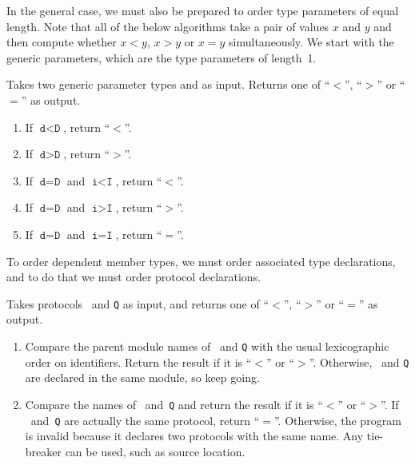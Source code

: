 \documentclass[../generics]{subfiles}
\begin{document}
In the general case, we must also be prepared to order type parameters of equal length. Note that all of the below algorithms take a pair of values $x$ and $y$ and then compute whether $x<y$, $x>y$ or $x=y$ simultaneously. We start with the generic parameters, which are the type parameters of length~1.

\begin{algorithm}\label{generic parameter order} Takes two generic parameter types  and  as input. Returns one of ``$<$'', ``$>$'' or ``$=$'' as output.
\begin{enumerate}
\item If $\texttt{d}<\texttt{D}$, return ``$<$''.
\item If $\texttt{d}>\texttt{D}$, return ``$>$''.
\item If $\texttt{d}=\texttt{D}$ and $\texttt{i}<\texttt{I}$, return ``$<$''.
\item If $\texttt{d}=\texttt{D}$ and $\texttt{i}>\texttt{I}$, return ``$>$''.
\item If $\texttt{d}=\texttt{D}$ and $\texttt{i}=\texttt{I}$, return ``$=$''.
\end{enumerate}
\end{algorithm}

To order dependent member types, we must order associated type declarations, and to do that we must order protocol declarations.

\begin{algorithm}\label{linear protocol order} Takes protocols \tP\ and \texttt{Q} as input, and returns one of ``$<$'', ``$>$'' or ``$=$'' as output.
\begin{enumerate}
\item Compare the parent module names of \tP\ and \texttt{Q} with the usual lexicographic order on identifiers. Return the result if it is ``$<$'' or ``$>$''. Otherwise, \tP\ and \texttt{Q} are declared in the same module, so keep going.
\item Compare the names of \tP\ and~\texttt{Q} and return the result if it is ``$<$'' or ``$>$''. If \tP~and~\texttt{Q} are actually the same protocol, return ``$=$''. Otherwise, the program is invalid because it declares two protocols with the same name. Any tie-breaker can be used, such as source location.
\end{enumerate}
\end{algorithm}
\end{document}
